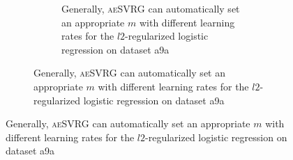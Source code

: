 \documentclass[conference]{IEEEtran}
\begin{document}
\begin{algorithm}[t]
\begin{itemize}
\begin{figure}[ht]
\begin{figure}[ht]
\begin{figure}[ht]
\centering
{}

\caption{Generally, \textsc{aeSVRG} can automatically set an appropriate $m$ with different learning rates for the $l2$-regularized logistic regression on dataset a9a}
\label{figure_logistic_a9a}
\end{figure}


\end{figure}
\end{figure}
\end{itemize}
\end{algorithm}
\end{document}
